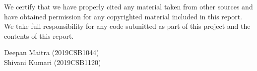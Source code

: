 


\begin{honorcode}      %

We certify that we have properly cited any material taken from other sources and have obtained permission for any
copyrighted material included in this report. We take full responsibility for any code submitted as part of this 
project and the contents of this report. \\

\vspace*{12mm}

\begin{flushright}
Deepan Maitra (2019CSB1044) \\ \vspace*{5mm} Shivani Kumari (2019CSB1120) \\ 
\end{flushright}

\end{honorcode}



